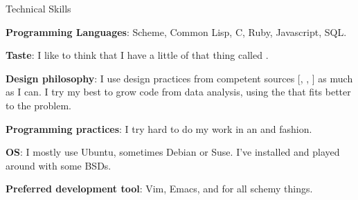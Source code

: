 \begin{rubric}{Technical Skills}{ 

    \entry* \textbf{Programming Languages}: Scheme, Common Lisp, C,
    Ruby, Javascript, SQL.

    \entry* \textbf{Taste}: I like to think that I have a little of that thing
    called .

    \entry* \textbf{Design philosophy}: I use design practices from
    competent sources
    [,
     ,
     ]
    as much as I can. I try my best to grow code from data analysis,
    using the
    that fits better to the problem.

    \entry* \textbf{Programming practices}: I try hard to do my work in an
    and
    fashion.

    \entry* \textbf{OS}: I mostly use Ubuntu, sometimes Debian or Suse. I've
    installed and played around with some BSDs.

    \entry* \textbf{Preferred development tool}: Vim, Emacs, and
    for all schemy things. 

}\end{rubric}
